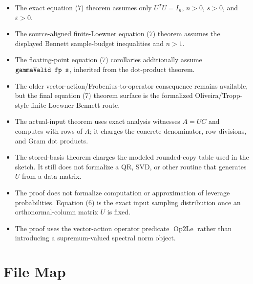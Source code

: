 \documentclass[11pt]{article}
\newcommand{\lean}[1]{\texttt{\detokenize{#1}}}
\theoremstyle{definition}
\theoremstyle{remark}
\begin{document}
\begin{itemize}[leftmargin=2em]
  \item The exact equation (7) theorem assumes only \(U^TU=I_n\), \(n>0\),
  \(s>0\), and \(\varepsilon>0\).
  \item The source-aligned finite-Loewner equation (7) theorem assumes the
  displayed Bennett sample-budget inequalities and \(n>1\).
  \item The floating-point equation (7) corollaries additionally assume
  \(\lean{gammaValid fp s}\), inherited from the dot-product theorem.
  \item The older vector-action/Frobenius-to-operator consequence remains
  available, but the final equation (7) theorem surface is the formalized
  Oliveira/Tropp-style finite-Loewner Bennett route.
  \item The actual-input theorem uses exact analysis witnesses \(A=UC\) and
  computes with rows of \(A\); it charges the concrete denominator, row
  divisions, and Gram dot products.
  \item The stored-basis theorem charges the modeled rounded-copy table used
  in the sketch.  It still does not formalize a QR, SVD, or other routine that
  generates \(U\) from a data matrix.
  \item The proof does not formalize computation or approximation of leverage
  probabilities.  Equation (6) is the exact input sampling distribution once an
  orthonormal-column matrix \(U\) is fixed.
  \item The proof uses the vector-action operator predicate
  \(\operatorname{Op2Le}\) rather than introducing a supremum-valued spectral
  norm object.
\end{itemize}

\section{File Map}
\end{document}
